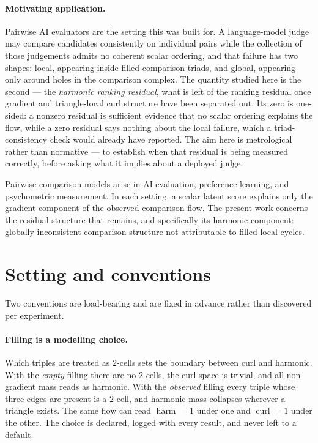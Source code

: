 \documentclass[11pt,a4paper]{article}
\newcommand{\curl}{\operatorname{curl}}
\newcommand{\harm}{\operatorname{harm}}
\begin{document}
\paragraph{Motivating application.} Pairwise AI evaluators are the setting this
was built for. A language-model judge may compare candidates consistently on
individual pairs while the collection of those judgements admits no coherent
scalar ordering, and that failure has two shapes: local, appearing inside filled
comparison triads, and global, appearing only around holes in the comparison
complex. The quantity studied here is the second --- the \emph{harmonic ranking
residual}, what is left of the ranking residual once gradient and triangle-local
curl structure have been separated out. Its zero is one-sided: a nonzero residual
is sufficient evidence that no scalar ordering explains the flow, while a zero
residual says nothing about the local failure, which a triad-consistency check
would already have reported. The aim here is metrological rather than normative
--- to establish when that residual is being measured correctly, before asking
what it implies about a deployed judge.

Pairwise comparison models arise in AI evaluation, preference learning, and
psychometric measurement. In each setting, a scalar latent score explains only
the gradient component of the observed comparison flow. The present work
concerns the residual structure that remains, and specifically its harmonic
component: globally inconsistent comparison structure not attributable to filled
local cycles.

\section{Setting and conventions}

Two conventions are load-bearing and are fixed in advance rather than discovered
per experiment.

\paragraph{Filling is a modelling choice.} Which triples are treated as
$2$-cells sets the boundary between curl and harmonic. With the \emph{empty}
filling there are no $2$-cells, the curl space is trivial, and all non-gradient
mass reads as harmonic. With the \emph{observed} filling every triple whose three
edges are present is a $2$-cell, and harmonic mass collapses wherever a triangle
exists. The same flow can read $\harm=1$ under one and $\curl=1$ under the other.
The choice is declared, logged with every result, and never left to a default.
\end{document}
